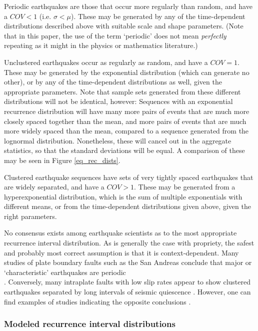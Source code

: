 \documentclass[se, manuscript]{copernicus}
\begin{document}
Periodic earthquakes are those that occur more regularly than random,
and have a \(COV < 1\) (i.e. \(\sigma < \mu\)). These may be generated
by any of the time-dependent distributions described above with suitable
scale and shape parameters. (Note that in this paper, the use of the
term `periodic' does not mean \emph{perfectly} repeating as it might in
the physics or mathematics literature.)

Unclustered earthquakes occur as regularly as random, and have a
\(COV=1\). These may be generated by the exponential distribution (which
can generate no other), or by any of the time-dependent distributions as
well, given the appropriate parameters. Note that sample sets generated
from these different distributions will not be identical, however:
Sequences with an exponential recurrence distribution will have many
more pairs of events that are much more closely spaced together than the
mean, and more pairs of events that are much more widely spaced than the
mean, compared to a sequence generated from the lognormal distribution.
Nonetheless, these will cancel out in the aggregate statistics, so that
the standard deviations will be equal. A comparison of these may be seen
in Figure \ref{eq_rec_dists}.

Clustered earthquake sequences have sets of very tightly spaced
earthquakes that are widely separated, and have a \(COV>1\). These may
be generated from a hyperexponential distribution, which is the sum of
multiple exponentials with different means, or from the time-dependent
distributions given above, given the right parameters.

No consensus exists among earthquake scientists as to the most
appropriate recurrence interval distribution. As is generally the case
with propriety, the safest and probably most correct assumption is that
it is context-dependent. Many studies of plate boundary faults such as
the San Andreas conclude that major or `characteristic' earthquakes are
periodic\\
\citep[e.g.]{berryman_major_2012,scharer_quasi-periodic_2010}.
Conversely, many intraplate faults with low slip rates appear to show
clustered earthquakes separated by long intervals of seismic quiescence
\citep[e.g.]{clark_long-term_2012}. However, one can find examples of
studies indicating the opposite conclusions
\citep{tuttle_earthquake_2002,grant_paleoseismic_1994}.

\subsubsection{Modeled recurrence interval
distributions}\label{modeled-recurrence-interval-distributions}
\end{document}
